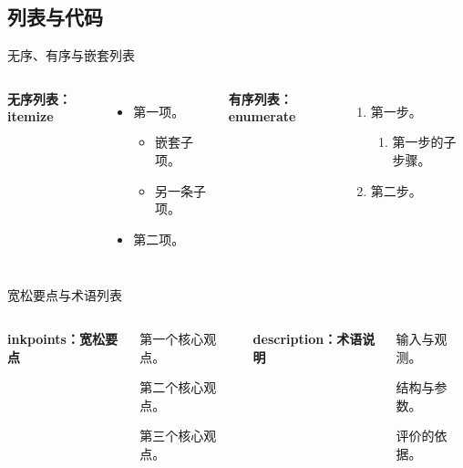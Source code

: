 \subsection{列表与代码}
\begin{frame}{无序、有序与嵌套列表}
  \begin{columns}[T,onlytextwidth]
      \textbf{无序列表：itemize}
      \begin{itemize}
        \item 第一项。
          \begin{itemize}
            \item 嵌套子项。
            \item 另一条子项。
          \end{itemize}
        \item 第二项。
      \end{itemize}
      \textbf{有序列表：enumerate}
      \begin{enumerate}
        \item 第一步。
          \begin{enumerate}
            \item 第一步的子步骤。
          \end{enumerate}
        \item 第二步。
      \end{enumerate}
  \end{columns}
\end{frame}

\begin{frame}{宽松要点与术语列表}
  \begin{columns}[T,onlytextwidth]
      \textbf{inkpoints：宽松要点}
      \begin{inkpoints}
        \item 第一个核心观点。
        \item 第二个核心观点。
        \item 第三个核心观点。
      \end{inkpoints}
      \textbf{description：术语说明}
      \begin{description}[模型]
        \item[数据] 输入与观测。
        \item[模型] 结构与参数。
        \item[指标] 评价的依据。
      \end{description}
  \end{columns}
\end{frame}

